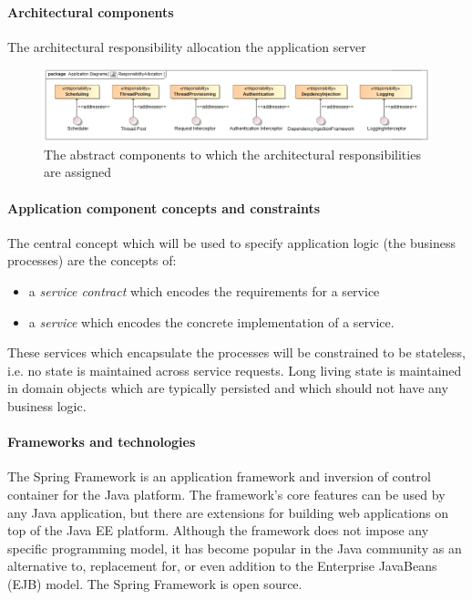 \documentclass[a4paper,12pt]{report}
\begin{document}
			\paragraph {Architectural components}
			\hfill \break
				The architectural responsibility allocation the application server			
				\begin{figure}[htb]
					\centering
					\includegraphics [scale=0.5]{../Diagrams/applicationServerResponsibiltiesAllocationZ.png}
					\caption{The abstract components to which the architectural responsibilities are assigned}
				\end{figure}
			
			\paragraph {Application component concepts and constraints}
			The central concept which will be used to specify application logic (the business processes) are the
			concepts of:
				\begin {itemize}
					\item a \textit{service contract} which encodes the requirements for a service
					\item a \textit{service} which encodes the concrete implementation of a service. 
				\end {itemize}
			These services which encapsulate the processes will be constrained to be stateless, i.e. no state
			is maintained across service requests.
			Long living state is maintained in domain objects which are typically persisted and which should
			not have any business logic.
			
			\paragraph {Frameworks and technologies}
			\hfill \break
			The Spring Framework is an application framework and inversion of control container for the Java platform. The framework's core features can be used by any Java application, but there are extensions for building web applications on top of the Java EE platform. Although the framework does not impose any specific programming model, it has become popular in the Java community as an alternative to, replacement for, or even addition to the Enterprise JavaBeans (EJB) model. The Spring Framework is open source.
			
\end{document}
